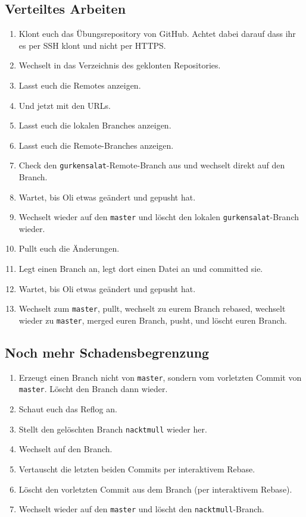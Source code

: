 \documentclass[a4paper,12pt]{scrartcl}
\begin{document}
\subsection{Verteiltes Arbeiten}
\begin{enumerate}
  \item Klont euch das Übungsrepository von GitHub. Achtet dabei darauf dass ihr es per SSH klont und nicht per HTTPS.
  \item Wechselt in das Verzeichnis des geklonten Repositories.
  \item Lasst euch die Remotes anzeigen.
  \item Und jetzt mit den URLs.
  \item Lasst euch die lokalen Branches anzeigen.
  \item Lasst euch die Remote-Branches anzeigen.
  \item Check den \texttt{gurkensalat}-Remote-Branch aus und wechselt direkt auf den Branch.
  \item Wartet, bis Oli etwas geändert und gepusht hat.
  \item Wechselt wieder auf den \texttt{master} und löscht den lokalen \texttt{gurkensalat}-Branch wieder.
  \item Pullt euch die Änderungen.
  \item Legt einen Branch an, legt dort einen Datei an und committed sie.
  \item Wartet, bis Oli etwas geändert und gepusht hat.
  \item Wechselt zum \texttt{master}, pullt, wechselt zu eurem Branch rebased, wechselt wieder zu \texttt{master}, merged euren Branch, pusht, und löscht euren Branch.
\end{enumerate}

\subsection{Noch mehr Schadensbegrenzung}
\begin{enumerate}
  \item Erzeugt einen Branch nicht von \texttt{master}, sondern vom vorletzten Commit von \texttt{master}. Löscht den Branch dann wieder.
  \item Schaut euch das Reflog an.
  \item Stellt den gelöschten Branch \texttt{nacktmull} wieder her.
  \item Wechselt auf den Branch.
  \item Vertauscht die letzten beiden Commits per interaktivem Rebase.
  \item Löscht den vorletzten Commit aus dem Branch (per interaktivem Rebase).
  \item Wechselt wieder auf den \texttt{master} und löscht den \texttt{nacktmull}-Branch.
\end{enumerate}
\end{document}
